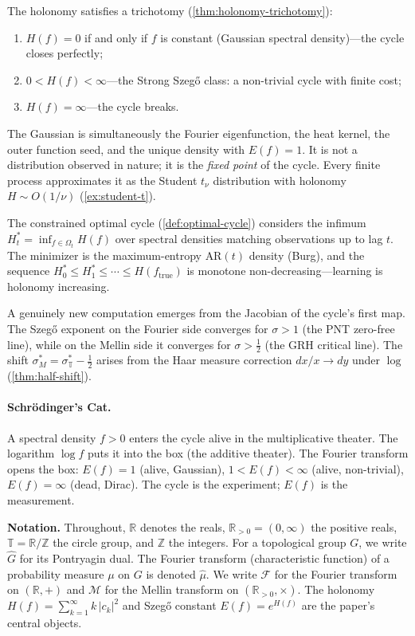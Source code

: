 \documentclass[12pt]{amsart}
\theoremstyle{definition}
\theoremstyle{remark}
\newcommand{\R}{\mathbb{R}}
\newcommand{\Rpos}{\mathbb{R}_{>0}}
\newcommand{\bT}{\mathbb{T}}
\newcommand{\Z}{\mathbb{Z}}
\newcommand{\cF}{\mathcal{F}}
\newcommand{\cM}{\mathcal{M}}
\begin{document}
The holonomy satisfies a trichotomy (\cref{thm:holonomy-trichotomy}):
\begin{enumerate}[label=(\roman*)]
\item $H(f) = 0$ if and only if $f$ is constant (Gaussian spectral density)---the cycle closes perfectly;
\item $0 < H(f) < \infty$---the Strong Szeg\H{o} class: a non-trivial cycle with finite cost;
\item $H(f) = \infty$---the cycle breaks.
\end{enumerate}
The Gaussian is simultaneously the Fourier eigenfunction, the heat kernel, the outer function seed, and the unique density with $E(f) = 1$. It is not a distribution observed in nature; it is the \emph{fixed point} of the cycle. Every finite process approximates it as the Student $t_\nu$ distribution with holonomy $H \sim O(1/\nu)$ (\cref{ex:student-t}).

The constrained optimal cycle (\cref{def:optimal-cycle}) considers the infimum $H_t^* = \inf_{f \in \Omega_t} H(f)$ over spectral densities matching observations up to lag $t$. The minimizer is the maximum-entropy AR$(t)$ density (Burg), and the sequence $H_0^* \leq H_1^* \leq \cdots \leq H(f_{\mathrm{true}})$ is monotone non-decreasing---learning is holonomy increasing.

A genuinely new computation emerges from the Jacobian of the cycle's first map. The Szeg\H{o} exponent on the Fourier side converges for $\sigma > 1$ (the PNT zero-free line), while on the Mellin side it converges for $\sigma > \tfrac{1}{2}$ (the GRH critical line). The shift $\sigma_M^* = \sigma_{\bT}^* - \tfrac{1}{2}$ arises from the Haar measure correction $dx/x \to dy$ under $\log$ (\cref{thm:half-shift}).

\paragraph{Schr\"odinger's Cat.}
A spectral density $f > 0$ enters the cycle alive in the multiplicative theater. The logarithm $\log f$ puts it into the box (the additive theater). The Fourier transform opens the box: $E(f) = 1$ (alive, Gaussian), $1 < E(f) < \infty$ (alive, non-trivial), $E(f) = \infty$ (dead, Dirac). The cycle is the experiment; $E(f)$ is the measurement.

\medskip
\noindent\textbf{Notation.}
Throughout, $\R$ denotes the reals, $\Rpos = (0, \infty)$ the positive reals, $\bT = \R / \Z$ the circle group, and $\Z$ the integers. For a topological group $G$, we write $\widehat{G}$ for its Pontryagin dual. The Fourier transform (characteristic function) of a probability measure $\mu$ on $G$ is denoted $\widehat{\mu}$. We write $\cF$ for the Fourier transform on $(\R, +)$ and $\cM$ for the Mellin transform on $(\Rpos, \times)$. The holonomy $H(f) = \sum_{k=1}^{\infty} k\,|c_k|^2$ and Szeg\H{o} constant $E(f) = e^{H(f)}$ are the paper's central objects.
\end{document}
